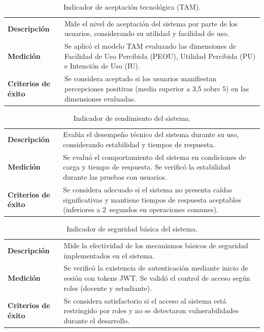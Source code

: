 \begin{table}[H]
\centering
\caption{Indicador de aceptación tecnológica (TAM).}
\label{tab:ind_tam}
\begin{tabularx}{\textwidth}{|L{3.5cm}|X|}
\hline
{}
 & \\
\hline
\textbf{Descripción} & Mide el nivel de aceptación del sistema por parte de los usuarios, considerando su utilidad y facilidad de uso.\\
\hline
\textbf{Medición} & Se aplicó el modelo TAM evaluando las dimensiones de Facilidad de Uso Percibida (PEOU), Utilidad Percibida (PU) e Intención de Uso (IU).\\
\hline
\textbf{Criterios de éxito} & Se considera aceptado si los usuarios manifiestan percepciones positivas (media superior a 3,5 sobre 5) en las dimensiones evaluadas.\\
\hline
\end{tabularx}
\fuenteautor
\end{table}

\begin{table}[H]
\centering
\caption{Indicador de rendimiento del sistema.}
\label{tab:ind_rendimiento}
\begin{tabularx}{\textwidth}{|L{3.5cm}|X|}
\hline
{}
 & \\
\hline
\textbf{Descripción} & Evalúa el desempeño técnico del sistema durante su uso, considerando estabilidad y tiempos de respuesta.\\
\hline
\textbf{Medición} & Se evaluó el comportamiento del sistema en condiciones de carga y tiempo de respuesta. Se verificó la estabilidad durante las pruebas con usuarios.\\
\hline
\textbf{Criterios de éxito} & Se considera adecuado si el sistema no presenta caídas significativas y mantiene tiempos de respuesta aceptables (inferiores a 2~segundos en operaciones comunes).\\
\hline
\end{tabularx}
\fuenteautor
\end{table}

\begin{table}[H]
\centering
\caption{Indicador de seguridad básica del sistema.}
\label{tab:ind_seguridad}
\begin{tabularx}{\textwidth}{|L{3.5cm}|X|}
\hline
{}
 & \\
\hline
\textbf{Descripción} & Mide la efectividad de los mecanismos básicos de seguridad implementados en el sistema.\\
\hline
\textbf{Medición} & Se verificó la existencia de autenticación mediante inicio de sesión con tokens JWT. Se validó el control de acceso según roles (docente y estudiante).\\
\hline
\textbf{Criterios de éxito} & Se considera satisfactorio si el acceso al sistema está restringido por roles y no se detectaron vulnerabilidades durante el desarrollo.\\
\hline
\end{tabularx}
\fuenteautor
\end{table}

